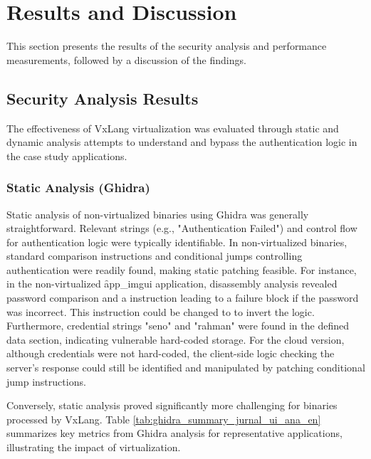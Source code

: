 \section{Results and Discussion}
\label{sec:results_jurnal_ui_ana_en_full}

This section presents the results of the security analysis and performance measurements, followed by a discussion of the findings.

\subsection{Security Analysis Results}
The effectiveness of VxLang virtualization was evaluated through static and dynamic analysis attempts to understand and bypass the authentication logic in the case study applications.

\subsubsection{Static Analysis (Ghidra)}
Static analysis of non-virtualized binaries using Ghidra was generally straightforward. Relevant strings (e.g., "Authentication Failed") and control flow for authentication logic were typically identifiable. In non-virtualized binaries, standard comparison instructions and conditional jumps controlling authentication were readily found, making static patching feasible. For instance, in the non-virtualized \f{app\_imgui} application, disassembly analysis revealed password comparison and a  instruction leading to a failure block if the password was incorrect. This instruction could be changed to  to invert the logic. Furthermore, credential strings "seno" and "rahman" were found in the defined data section, indicating vulnerable hard-coded storage. For the cloud version, although credentials were not hard-coded, the client-side logic checking the server's response could still be identified and manipulated by patching conditional jump instructions.

Conversely, static analysis proved significantly more challenging for binaries processed by VxLang. Table \ref{tab:ghidra_summary_jurnal_ui_ana_en} summarizes key metrics from Ghidra analysis for representative applications, illustrating the impact of virtualization.

